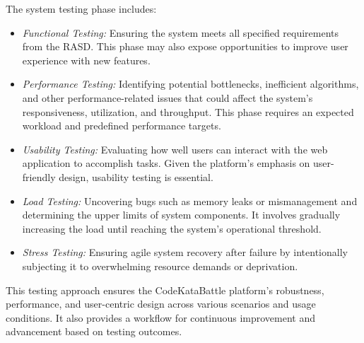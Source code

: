 The system testing phase includes:
\begin{itemize}
    \item \textit{Functional Testing:} Ensuring the system meets all specified requirements from the RASD. This phase may also expose opportunities to improve user experience with new features.
    \item \textit{Performance Testing:} Identifying potential bottlenecks, inefficient algorithms, and other performance-related issues that could affect the system's responsiveness, utilization, and throughput. This phase requires an expected workload and predefined performance targets.
    \item \textit{Usability Testing:} Evaluating how well users can interact with the web application to accomplish tasks. Given the platform's emphasis on user-friendly design, usability testing is essential.
    \item \textit{Load Testing:} Uncovering bugs such as memory leaks or mismanagement and determining the upper limits of system components. It involves gradually increasing the load until reaching the system's operational threshold.
    \item \textit{Stress Testing:} Ensuring agile system recovery after failure by intentionally subjecting it to overwhelming resource demands or deprivation.
\end{itemize}

This testing approach ensures the CodeKataBattle platform's robustness, performance, and user-centric design across various scenarios and usage conditions. It also provides a workflow for continuous improvement and advancement based on testing outcomes.